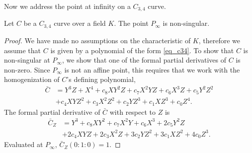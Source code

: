 Now we address the point at infinity on a $C_{3,4}$ curve.
\begin{comment}
\begin{proposition}
  Let $C$ be a $C_{3,4}$ curve over a field $K$.
  Then $C$ has only a single point at infinity, $(0 : 1 : 0)$.
\end{proposition}
We have made no assumptions on the characteristic of $K$,
so we may not assume any coefficients of $C$ are zero.
\begin{proof}
  Consider the homogeneous polynomial $\bar C$ defining the projective closure of $C$,
  \begin{align*}
    \bar C &= Y^3Z + X^4 + c_8XY^2Z + c_7X^2YZ + c_6X^3Z + c_5Y^2Z^2 \\ 
           &+ c_4XYZ^2 + c_3X^2Z^2 + c_2YZ^3 + c_1XZ^3 + c_0Z^4.
  \end{align*}
  At $Z = 0$, we have $\bar C(X,Y,0) = X^4$.
  If $\bar C(X,Y,0) = 0$, then $X = 0$.
  Therefore any solution to $\bar C$ with $Z = 0$ is of the form $(0, Y, 0)$ for some $Y$,
  while every point $(0, Y, 0) \in K^3$ is a solution to $C$.
  In $\bb P_{\bar K}^2$, $(0 : 0 : 0)$ is not a point, and every other $(0 : Y : 0)$ is equivalent to $(0 : 1 : 0)$.
  Therefore, there is only a single point at infinity, $(0 : 1 : 0)$, on $C$.
\end{proof}
Denote the unique point at infinity on a $C_{3,4}$ curve by $P_\infty$.
\end{comment}
\begin{proposition}
  Let $C$ be a $C_{3,4}$ curve over a field $K$.
  The point $P_\infty$ is non-singular.
\end{proposition}
\begin{proof}
  We have made no assumptions on the characteristic of $K$,
  therefore we assume that $C$ is given by a polynomial of the form \ref{eq_c34}.
  To show that $C$ is non-singular at $P_\infty$,
  we show that one of the formal partial derivatives of $C$ is non-zero.
  Since $P_\infty$ is not an affine point,
  this requires that we work with the homogenization of $C$'s defining polynomial,
  \begin{align*}
    \bar C &= Y^3Z + X^4 + c_8XY^2Z + c_7X^2YZ + c_6X^3Z + c_5Y^2Z^2 \\ 
           &+ c_4XYZ^2 + c_3X^2Z^2 + c_2YZ^3 + c_1XZ^3 + c_0Z^4.
  \end{align*}
  The formal partial derivative of $\bar C$ with respect to $Z$ is
  \begin{align*}
    \bar C_Z &= Y^3 + c_8XY^2 + c_7X^2Y + c_6X^3 + 2c_5Y^2Z \\
             &+ 2c_4XYZ + 2c_3X^2Z + 3c_2YZ^2 + 3c_1XZ^2 + 4c_0Z^3.
  \end{align*}
  Evaluated at $P_\infty$, $\bar C_Z(0 : 1 : 0) = 1$.
\end{proof}



